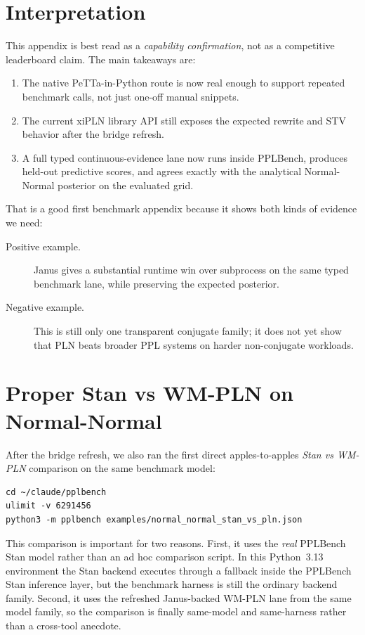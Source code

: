 \documentclass[11pt,openany]{report}
\begin{document}
\section{Interpretation}

This appendix is best read as a \emph{capability confirmation}, not as a
competitive leaderboard claim.  The main takeaways are:
\begin{enumerate}
\item The native PeTTa-in-Python route is now real enough to support repeated
benchmark calls, not just one-off manual snippets.
\item The current xiPLN library API still exposes the expected rewrite and
STV behavior after the bridge refresh.
\item A full typed continuous-evidence lane now runs inside PPLBench, produces
held-out predictive scores, and agrees exactly with the analytical
Normal-Normal posterior on the evaluated grid.
\end{enumerate}

That is a good first benchmark appendix because it shows both kinds of
evidence we need:
\begin{description}
\item[Positive example.] Janus gives a substantial runtime win over subprocess
on the same typed benchmark lane, while preserving the expected posterior.
\item[Negative example.] This is still only one transparent conjugate family;
it does not yet show that PLN beats broader PPL systems on harder
non-conjugate workloads.
\end{description}

\section{Proper Stan vs WM-PLN on Normal-Normal}
\label{app:pplbench-stan-pln}

After the bridge refresh, we also ran the first direct apples-to-apples
\emph{Stan vs WM-PLN} comparison on the same benchmark model:
\begin{lstlisting}
cd ~/claude/pplbench
ulimit -v 6291456
python3 -m pplbench examples/normal_normal_stan_vs_pln.json
\end{lstlisting}

This comparison is important for two reasons.
First, it uses the \emph{real} PPLBench Stan model rather than an ad hoc
comparison script.  In this Python~3.13 environment the Stan backend executes
through a  fallback inside the PPLBench Stan inference layer,
but the benchmark harness is still the ordinary 
backend family.  Second, it uses the refreshed Janus-backed WM-PLN lane from
the same  model family, so the comparison is finally
same-model and same-harness rather than a cross-tool anecdote.
\end{document}
